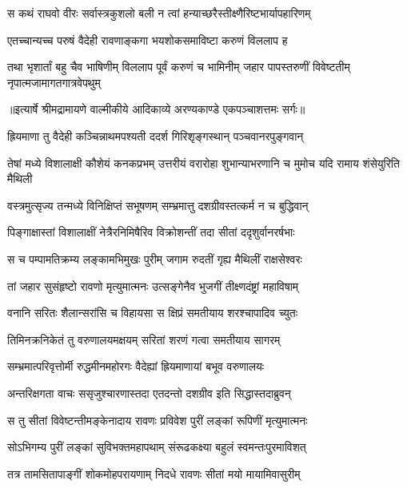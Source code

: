 \twolineshloka
{स कथं राघवो वीरः सर्वास्त्रकुशलो बली}
{न त्वां हन्याच्छरैस्तीक्ष्णैरिष्टभार्यापहारिणम्} %

\twolineshloka
{एतच्चान्यच्च परुषं वैदेही रावणाङ्कगा}
{भयशोकसमाविष्टा करुणं विललाप ह} %

\fourlineindentedshloka
{तथा भृशार्तां बहु चैव भाषिणीम्}
{विललाप पूर्वं करुणं च भामिनीम्}
{जहार पापस्तरुणीं विवेष्टतीम्}
{नृपात्मजामागतगात्रवेपथुम्} %


{॥इत्यार्षे श्रीमद्रामायणे वाल्मीकीये आदिकाव्ये अरण्यकाण्डे एकपञ्चाशत्तमः सर्गः॥}


\twolineshloka
{ह्रियमाणा तु वैदेही कञ्चिन्नाथमपश्यती}
{ददर्श गिरिशृङ्गस्थान् पञ्चवानरपुङ्गवान्} %

\threelineshloka
{तेषां मध्ये विशालाक्षी कौशेयं कनकप्रभम्}
{उत्तरीयं वरारोहा शुभान्याभरणानि च}
{मुमोच यदि रामाय शंसेयुरिति मैथिली} %

\twolineshloka
{वस्त्रमुत्सृज्य तन्मध्ये विनिक्षिप्तं सभूषणम्}
{सम्भ्रमात्तु दशग्रीवस्तत्कर्म न च बुद्धिवान्} %

\twolineshloka
{पिङ्गाक्षास्तां विशालाक्षीं नेत्रैरनिमिषैरिव}
{विक्रोशन्तीं तदा सीतां ददृशुर्वानरर्षभाः} %

\twolineshloka
{स च पम्पामतिक्रम्य लङ्कामभिमुखः पुरीम्}
{जगाम रुदतीं गृह्य मैथिलीं राक्षसेश्वरः} %

\twolineshloka
{तां जहार सुसंहृष्टो रावणो मृत्युमात्मनः}
{उत्सङ्गेनैव भुजगीं तीक्ष्णदंष्ट्रां महाविषाम्} %

\twolineshloka
{वनानि सरितः शैलान्सरांसि च विहायसा}
{स क्षिप्रं समतीयाय शरश्चापादिव च्युतः} %

\twolineshloka
{तिमिनक्रनिकेतं तु वरुणालयमक्षयम्}
{सरितां शरणं गत्वा समतीयाय सागरम्} %

\twolineshloka
{सम्भ्रमात्परिवृत्तोर्मी रुद्धमीनमहोरगः}
{वैदेह्यां ह्रियमाणायां बभूव वरुणालयः} %

\twolineshloka
{अन्तरिक्षगता वाचः ससृजुश्चारणास्तदा}
{एतदन्तो दशग्रीव इति सिद्धास्तदाब्रुवन्} %

\twolineshloka
{स तु सीतां विवेष्टन्तीमङ्केनादाय रावणः}
{प्रविवेश पुरीं लङ्कां रूपिणीं मृत्युमात्मनः} %

\twolineshloka
{सोऽभिगम्य पुरीं लङ्कां सुविभक्तमहापथाम्}
{संरूढकक्ष्या बहुलं स्वमन्तःपुरमाविशत्} %

\twolineshloka
{तत्र तामसितापाङ्गीं शोकमोहपरायणाम्}
{निदधे रावणः सीतां मयो मायामिवासुरीम्} %

